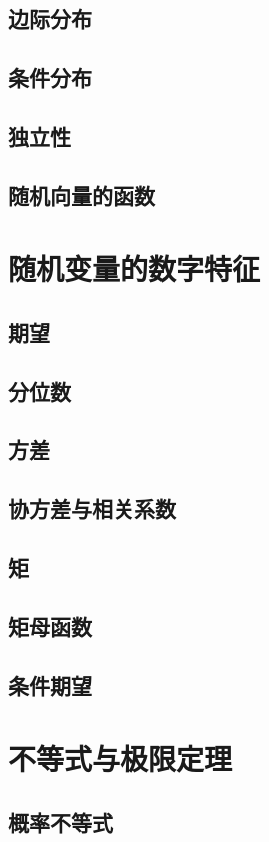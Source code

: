 \documentclass[zihao=-4,linespread=1.5,a4paper,heading=true,oneside]{ctexbook}
\theoremstyle{definition}
\begin{document}
\section{边际分布}\label{sec:3.4}

\section{条件分布}\label{sec:3.5}

\section{独立性}\label{sec:3.6}

\section{随机向量的函数}\label{sec:3.7}


\chapter{随机变量的数字特征}\label{chap:4}
\section{期望}\label{sec:4.1}

\section{分位数}\label{sec:4.2}

\section{方差}\label{sec:4.3}

\section{协方差与相关系数}\label{sec:4.4}

\section{矩}\label{sec:4.5}

\section{矩母函数}\label{sec:4.6}

\section{条件期望}\label{sec:4.7}


\chapter{不等式与极限定理}\label{chap:5}
\section{概率不等式}\label{sec:5.1}


\end{document}
